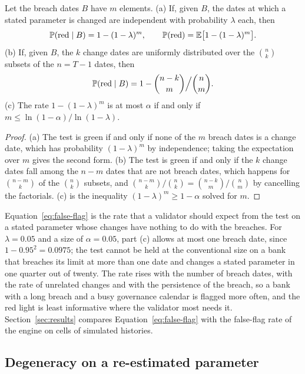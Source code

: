 \begin{proposition}
\label{prop:false-flag}
Let the breach dates $B$ have $m$ elements. (a) If, given $B$, the dates at which a stated parameter is changed are independent with probability $\lambda$ each, then
\begin{equation}
\mathbb{P}(\text{red}\mid B)=1-(1-\lambda)^{m},\qquad \mathbb{P}(\text{red})=\mathbb{E}\bigl[1-(1-\lambda)^{m}\bigr].
\label{eq:false-flag}
\end{equation}
(b) If, given $B$, the $k$ change dates are uniformly distributed over the $\binom nk$ subsets of the $n=T-1$ dates, then
\begin{equation}
\mathbb{P}(\text{red}\mid B)=1-\binom{n-k}{m}\Big/\binom nm .
\label{eq:hypergeometric}
\end{equation}
(c) The rate $1-(1-\lambda)^m$ is at most $\alpha$ if and only if $m\le\ln(1-\alpha)/\ln(1-\lambda)$.
\end{proposition}
\begin{proof}
(a) The test is green if and only if none of the $m$ breach dates is a change date, which has probability $(1-\lambda)^m$ by independence; taking the expectation over $m$ gives the second form. (b) The test is green if and only if the $k$ change dates fall among the $n-m$ dates that are not breach dates, which happens for $\binom{n-m}{k}$ of the $\binom nk$ subsets, and $\binom{n-m}{k}/\binom nk=\binom{n-k}{m}/\binom nm$ by cancelling the factorials. (c) is the inequality $(1-\lambda)^m\ge 1-\alpha$ solved for $m$.
\end{proof}
Equation~\eqref{eq:false-flag} is the rate that a validator should expect from the test on a stated parameter whose changes have nothing to do with the breaches. For $\lambda=0.05$ and a size of $\alpha=0.05$, part (c) allows at most one breach date, since $1-0.95^2=0.0975$; the test cannot be held at the conventional size on a bank that breaches its limit at more than one date and changes a stated parameter in one quarter out of twenty. The rate rises with the number of breach dates, with the rate of unrelated changes and with the persistence of the breach, so a bank with a long breach and a busy governance calendar is flagged more often, and the red light is least informative where the validator most needs it. Section~\ref{sec:results} compares Equation~\eqref{eq:false-flag} with the false-flag rate of the engine on \statedCells{} cells of simulated histories.

\subsection{Degeneracy on a re-estimated parameter}
\label{sec:theory-degeneracy}

